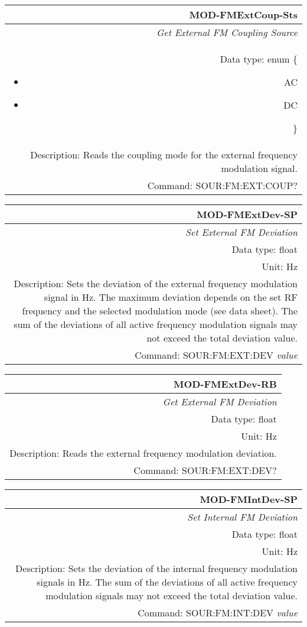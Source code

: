 \documentclass[openany]{article}
\begin{document}
		\begin{tabular}{N}
			\hline
			\bfseries MOD-FMExtCoup-Sts \\ \hline
			\emph{Get External FM Coupling Source} \\
			Data type: enum \{\begin{itemize}[noitemsep]
				\small
				\item[] AC
				\item[] DC
			\end{itemize}\} \\ 
			Description: Reads the coupling mode for the external frequency modulation signal. \\
			Command: SOUR:FM:EXT:COUP? \\

		\end{tabular}
%
		\begin{tabular}{N}
			\hline
			\bfseries MOD-FMExtDev-SP \\ \hline
			\emph{Set External FM Deviation} \\
			Data type: float \\
			Unit: Hz \\ 
			Description: Sets the deviation of the external frequency modulation signal in Hz. The maximum deviation depends on the set RF frequency and the selected modulation mode (see data sheet). The sum of the deviations of all active frequency modulation signals may not exceed the total deviation value. \\
			Command: SOUR:FM:EXT:DEV \emph{value} \\
			
		\end{tabular}


		\begin{tabular}{N}
			\hline
			\bfseries MOD-FMExtDev-RB \\ \hline
			\emph{Get External FM Deviation} \\
			Data type: float \\
			Unit: Hz \\
			Description: Reads the external frequency modulation deviation. \\
			Command: SOUR:FM:EXT:DEV? \\

		\end{tabular}
%
		\begin{tabular}{N}
			\hline
			\bfseries MOD-FMIntDev-SP \\ \hline
			\emph{Set Internal FM Deviation} \\
			Data type: float \\
			Unit: Hz \\ 
			Description: Sets the deviation of the internal frequency modulation signals in Hz. The sum of the deviations of all active frequency modulation signals may not exceed the total deviation value. \\
			Command: SOUR:FM:INT:DEV \emph{value} \\
			
		\end{tabular}
\end{document}
